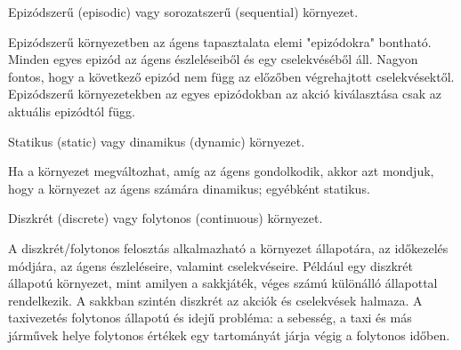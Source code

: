 \begin{definicio}
    Epizódszerű (episodic) vagy sorozatszerű (sequential) környezet.

    Epizódszerű környezetben az ágens tapasztalata elemi "epizódokra" bontható.
    Minden egyes epizód az ágens észleléseiből és egy cselekvéséből áll. Nagyon
    fontos, hogy a következő epizód nem függ az előzőben végrehajtott
    cselekvésektől.  Epizódszerű környezetekben az egyes epizódokban az akció
    kiválasztása csak az aktuális epizódtól függ.
\end{definicio}

\begin{definicio}
    Statikus (static) vagy dinamikus (dynamic) környezet.

    Ha a környezet megváltozhat, amíg az ágens gondolkodik, akkor azt mondjuk,
    hogy a környezet az ágens számára dinamikus; egyébként statikus.
\end{definicio}

\begin{definicio}
    Diszkrét (discrete) vagy folytonos (continuous) környezet.

    A diszkrét/folytonos felosztás alkalmazható a környezet állapotára, az
    időkezelés módjára, az ágens észleléseire, valamint cselekvéseire. Például
    egy diszkrét állapotú környezet, mint amilyen a sakkjáték, véges számú
    különálló állapottal rendelkezik. A sakkban szintén diszkrét az akciók és
    cselekvések halmaza. A taxivezetés folytonos állapotú és idejű probléma: a
    sebesség, a taxi és más járművek helye folytonos értékek egy tartományát
    járja végig a folytonos időben.
\end{definicio}

